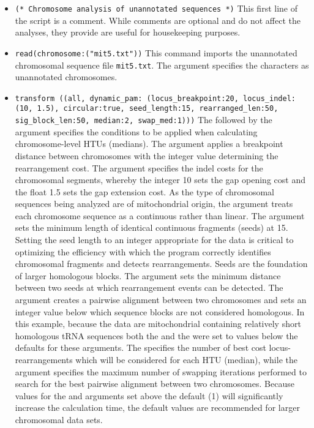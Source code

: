 \begin{itemize}
\item \texttt{(* Chromosome analysis of unannotated sequences *)} This first line of the script is a comment. While comments are optional and do not affect the analyses, they provide are useful for housekeeping purposes.
\item \texttt{read(chromosome:("mit5.txt"))} This command imports the unannotated chromosomal sequence file \texttt{mit5.txt}. The argument  specifies the characters as unannotated chromosomes.
\item \texttt{transform ((all, dynamic\_pam: (locus\_breakpoint:20, locus\_indel:(10, 1.5), circular:true, seed\_length:15, rearranged\_len:50, sig\_block\_len:50, median:2, swap\_med:1)))}  The  followed by the argument  specifies the conditions to be applied when calculating chromosome-level HTUs (medians).  The argument  applies a breakpoint distance between chromosomes with the integer value determining the rearrangement cost. The argument  specifies the indel costs for the chromosomal segments, whereby the integer 10 sets the gap opening cost and the float 1.5 sets the gap extension cost.  As the type of chromosomal sequences being analyzed are of mitochondrial origin, the argument  treats each chromosome sequence as a continuous rather than linear. The argument  sets the minimum length of identical continuous fragments (seeds) at 15.  Setting the seed length to an integer appropriate for the data is critical to optimizing the efficiency with which the program correctly identifies chromosomal fragments and detects rearrangements.  Seeds are the foundation of larger homologous blocks.  The  argument sets the minimum distance between two seeds at which rearrangement events can be detected.  The argument  creates a pairwise alignment between two chromosomes and sets an integer value below which sequence blocks are not considered homologous.  In this example, because the data are mitochondrial containing relatively short homologous tRNA sequences both the  and the  were set to values below the defaults for these arguments.  The  specifies the number of best cost locus-rearrangements which will be considered for each HTU (median), while the  argument specifies the maximum number of swapping iterations performed to search for the best pairwise alignment between two chromosomes.  Because values for the  and  arguments set above the default (1) will significantly increase the calculation time, the default values are recommended for larger chromosomal data sets.

\end{itemize}

